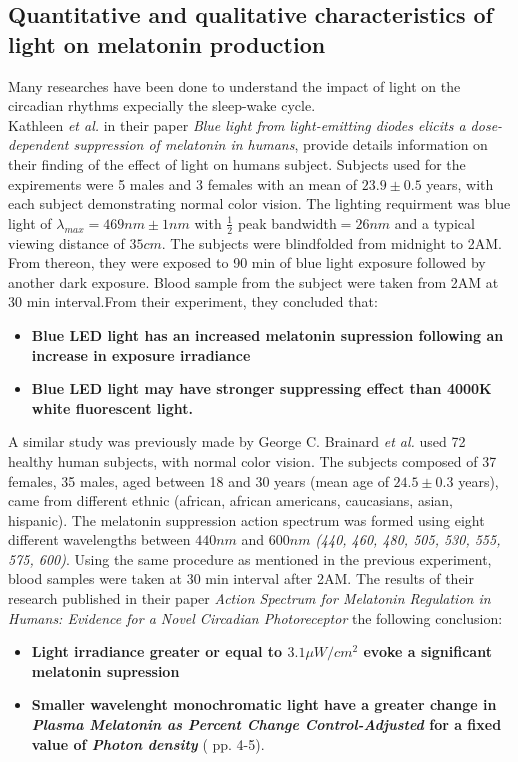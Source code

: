 \subsection{Quantitative and qualitative characteristics of light on melatonin production}
Many researches have been done to understand the impact of light on the circadian rhythms expecially the sleep-wake cycle. \\
Kathleen \textit{et al.} in their paper \textit{Blue light from light-emitting diodes elicits a dose-dependent suppression of melatonin in humans}\cite{bl2010}, provide details information on their finding of  the effect of light on humans subject. Subjects used for the expirements were 5 males and 3 females with an mean of $23.9\pm0.5$ years, with each subject demonstrating normal color vision. The lighting requirment was blue light of $\lambda_{max} = 469nm \pm 1nm $ with $\frac{1}{2}$ peak bandwidth$ = 26nm$ and a typical viewing distance of $35cm$. The subjects were blindfolded from midnight to 2AM. From thereon, they were exposed to 90 min of blue light exposure  followed by another dark exposure. Blood sample from the subject were taken from 2AM at 30 min interval.From their experiment, they concluded that:
\begin{itemize}
\item \textbf{Blue LED light has an increased melatonin supression following an increase in exposure irradiance}
\item \textbf{Blue LED light may have stronger suppressing effect than 4000K white fluorescent light.}
\end{itemize}
A similar study was previously made by George C. Brainard \textit{et al.} \cite{ac2001} used 72 healthy human subjects, with normal color vision. The subjects composed of 37 females, 35 males, aged between 18 and 30 years (mean age of $24.5 \pm 0.3$ years), came from different ethnic (african, african americans, caucasians, asian, hispanic). The melatonin suppression action spectrum was formed using eight different wavelengths between $440nm$ and $600nm$ \textit{(440, 460, 480, 505, 530, 555, 575, 600)}. Using the same procedure as mentioned in the previous experiment, blood samples were taken at 30 min interval after 2AM. The results of their research published in their paper \textit{Action Spectrum for Melatonin Regulation in Humans: Evidence for a Novel Circadian Photoreceptor} the following conclusion:
\begin{itemize}
\item \textbf{Light irradiance greater or equal to $3.1 \mu W/cm^{2}$ evoke a significant melatonin supression}
\item \textbf{Smaller wavelenght monochromatic light have a greater change in \textit{Plasma Melatonin as Percent Change Control-Adjusted} for a fixed value of \textit{Photon density}} (\cite{ac2001} pp. 4-5).
\end{itemize}   

